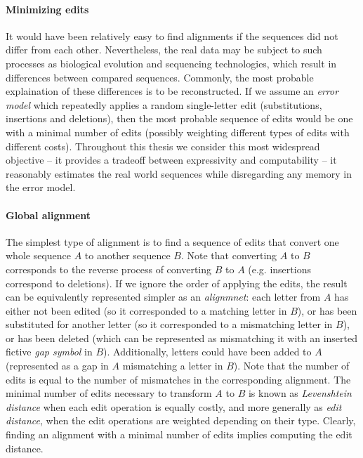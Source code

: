 
\paragraph{Minimizing edits}
It would have been relatively easy to find alignments if the sequences did not
differ from each other. Nevertheless, the real data may be subject to such
processes as biological evolution and sequencing technologies, which result in
differences between compared sequences. Commonly, the most probable explaination
of these differences is to be reconstructed. If we assume an \emph{error model}
which repeatedly applies a random single-letter edit (substitutions, insertions
and deletions), then the most probable sequence of edits would be one with a
minimal number of edits (possibly weighting different types of edits with
different costs). Throughout this thesis we consider this most widespread
objective -- it provides a tradeoff between expressivity and computability -- it
reasonably estimates the real world sequences while disregarding any memory in
the error model.

\paragraph{Global alignment}
The simplest type of alignment is to find a sequence of edits that convert one
whole sequence $A$ to another sequence $B$. Note that converting $A$ to $B$
corresponds to the reverse process of converting $B$ to $A$ (e.g. insertions
correspond to deletions). If we ignore the order of applying the edits, the
result can be equivalently represented simpler as an \emph{alignmnet}: each
letter from $A$ has either not been edited (so it corresponded to a matching
letter in $B$), or has been substituted for another letter (so it corresponded
to a mismatching letter in $B$), or has been deleted (which can be represented
as mismatching it with an inserted fictive \emph{gap symbol} in $B$).
Additionally, letters could have been added to $A$ (represented as a gap in $A$
mismatching a letter in $B$). Note that the number of edits is equal to the
number of mismatches in the corresponding alignment. The minimal number of edits
necessary to transform $A$ to $B$ is known as \emph{Levenshtein distance} when
each edit operation is equally costly, and more generally as \emph{edit
distance}, when the edit operations are weighted depending on their type.
Clearly, finding an alignment with a minimal number of edits implies computing
the edit distance.

